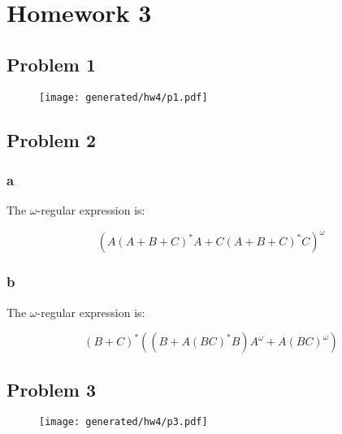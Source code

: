 \chapter{Homework 3}

\section{Problem 1}

\begin{figure}[H]
    \centering
    \texttt{[image: generated/hw4/p1.pdf]}
\end{figure}

\section{Problem 2}

\subsection{a}

The $\omega$-regular expression is:

$$
(A (A + B + C)^* A + C (A + B + C)^* C)^{\omega}
$$

\subsection{b}

The $\omega$-regular expression is:

$$
(B + C)^*((B + A(BC)^*B)A^{\omega} + A(BC)^{\omega})
$$

\section{Problem 3}

\begin{figure}[H]
    \centering
    \texttt{[image: generated/hw4/p3.pdf]}
\end{figure}

